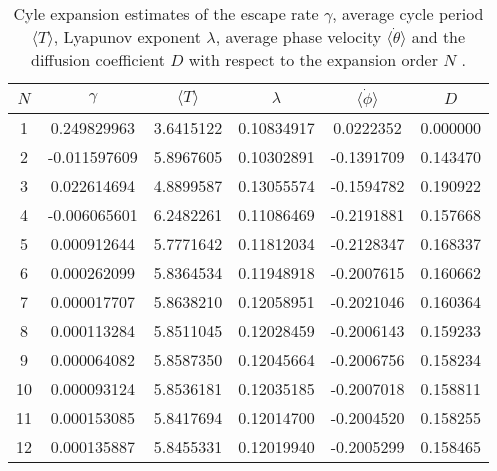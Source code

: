 \begin{table}
    \begin{tabular}{c|c|c|c|c|c}
     $N$ & $\gamma$ & $\langle T \rangle$ & $\lambda$ & $\langle \dot{\phi} \rangle$ & $D$ \\
    \hline
    1 & 0.249829963 & 3.6415122 & 0.10834917 & 0.0222352 & 0.000000 \\
    2 & -0.011597609 & 5.8967605 & 0.10302891 & -0.1391709 & 0.143470 \\
    3 & 0.022614694 & 4.8899587 & 0.13055574 & -0.1594782 & 0.190922 \\
    4 & -0.006065601 & 6.2482261 & 0.11086469 & -0.2191881 & 0.157668 \\
    5 & 0.000912644 & 5.7771642 & 0.11812034 & -0.2128347 & 0.168337 \\
    6 & 0.000262099 & 5.8364534 & 0.11948918 & -0.2007615 & 0.160662 \\
    7 & 0.000017707 & 5.8638210 & 0.12058951 & -0.2021046 & 0.160364 \\
    8 & 0.000113284 & 5.8511045 & 0.12028459 & -0.2006143 & 0.159233 \\
    9 & 0.000064082 & 5.8587350 & 0.12045664 & -0.2006756 & 0.158234 \\
    10 & 0.000093124 & 5.8536181 & 0.12035185 & -0.2007018 & 0.158811 \\
    11 & 0.000153085 & 5.8417694 & 0.12014700 & -0.2004520 & 0.158255 \\
    12 & 0.000135887 & 5.8455331 & 0.12019940 & -0.2005299 & 0.158465 \\
    \end{tabular}
    \caption{Cyle expansion estimates of the escape rate $\gamma$, average
    cycle period $\langle T \rangle$, Lyapunov exponent $\lambda$, average
    phase velocity $\langle \dot{\theta} \rangle$ and the diffusion coefficient
    $D$ with respect to the expansion order $N$ .}
    \label{t-DynamicalAveragesNoGrammar1}
\end{table}
